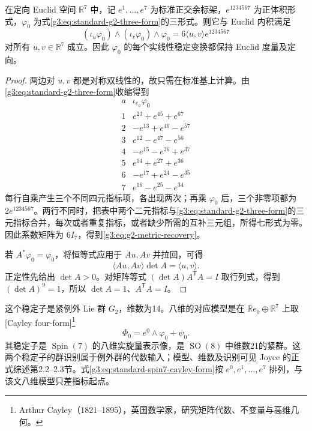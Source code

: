 \begin{proposition}\label{g3:prop:g2-form-recovers-metric}
	在定向 Euclid 空间 \(\mathbb R^7\) 中，记 \(e^1,\ldots,e^7\) 为标准正交余标架，\(e^{1234567}\) 为正体积形式，\(\varphi_0\) 为式\eqref{g3:eq:standard-g2-three-form}的三形式。则它与 Euclid 内积满足
	\begin{equation}\label{g3:eq:g2-metric-recovery}
		(\iota_u\varphi_0)\wedge(\iota_v\varphi_0)\wedge\varphi_0
		=6\langle u,v\rangle e^{1234567}
	\end{equation}
	对所有 \(u,v\in\mathbb R^7\) 成立。因此 \(\varphi_0\) 的每个实线性稳定变换都保持 Euclid 度量及定向。
\end{proposition}
\begin{proof}
	两边对 \(u,v\) 都是对称双线性的，故只需在标准基上计算。由\eqref{g3:eq:standard-g2-three-form}收缩得到
	\[
	\begin{array}{c|l}
		a&\iota_{e_a}\varphi_0\\\hline
		1&e^{23}+e^{45}+e^{67}\\
		2&-e^{13}+e^{46}-e^{57}\\
		3&e^{12}-e^{47}-e^{56}\\
		4&-e^{15}-e^{26}+e^{37}\\
		5&e^{14}+e^{27}+e^{36}\\
		6&-e^{17}+e^{24}-e^{35}\\
		7&e^{16}-e^{25}-e^{34}
	\end{array}
	\]
	每行自乘产生三个不同四元指标项，各出现两次；再乘 \(\varphi_0\) 后，三个非零项都为 \(2e^{1234567}\)。两行不同时，把表中两个二元指标与\eqref{g3:eq:standard-g2-three-form}的三元指标合并，每次或者重复指标，或者缺少所需的互补三元组，所得七形式为零。因此系数矩阵为 \(6I_7\)，得到\eqref{g3:eq:g2-metric-recovery}。

	若 \(A^*\varphi_0=\varphi_0\)，将恒等式应用于 \(Au,Av\) 并拉回，可得
	\[
		\langle Au,Av\rangle\det A=\langle u,v\rangle.
	\]
	正定性先给出 \(\det A>0\)。对矩阵等式 \((\det A)A^{\mathsf T}A=I\) 取行列式，得到 \((\det A)^9=1\)，所以 \(\det A=1\)、\(A^{\mathsf T}A=I\)。
\end{proof}

这个稳定子是紧例外 Lie 群 \(G_2\)，维数为14。八维的对应模型是在 \(\mathbb R e_0\oplus\mathbb R^7\) 上取[Cayley four-form]\footnote{Arthur Cayley（1821--1895），英国数学家，研究矩阵代数、不变量与高维几何。}
\begin{equation}\label{g3:eq:standard-spin7-cayley-form}
	\Phi_0=e^0\wedge\varphi_0+\psi_0.
\end{equation}
其稳定子是 \(\operatorname{Spin}(7)\) 的八维实旋量表示像，是 \(\operatorname{SO}(8)\) 中维数21的紧群。这两个稳定子的群识别属于例外群的代数输入；模型、维数及识别可见 Joyce 的正式综述第2.2--2.3节\cite[第2.2--2.3节，第112--113页]{Joyce2006ExceptionalHolonomy}。式\eqref{g3:eq:standard-spin7-cayley-form}按 \(e^0,e^1,\ldots,e^7\) 排列，与该文八维模型只差指标起点。


